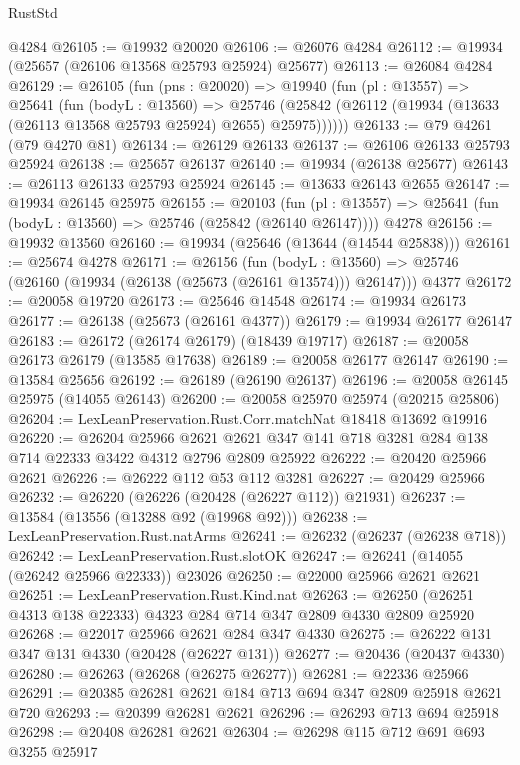 \begin{lexlean}{RustStd}
\begin{coremodule}
    @4284
@26105 := @19932 @20020
@26106 := @26076 @4284
@26112 := @19934 (@25657 (@26106 @13568 @25793 @25924) @25677)
@26113 := @26084 @4284
@26129 := @26105
    (fun (pns : @20020) =>
    @19940
      (fun (pl : @13557) =>
      @25641
        (fun (bodyL : @13560) =>
        @25746 (@25842 (@26112 (@19934 (@13633 (@26113 @13568 @25793 @25924) @2655) @25975))))))
@26133 := @79 @4261 (@79 @4270 @81)
@26134 := @26129 @26133
@26137 := @26106 @26133 @25793 @25924
@26138 := @25657 @26137
@26140 := @19934 (@26138 @25677)
@26143 := @26113 @26133 @25793 @25924
@26145 := @13633 @26143 @2655
@26147 := @19934 @26145 @25975
@26155 := @20103
    (fun (pl : @13557) => @25641 (fun (bodyL : @13560) => @25746 (@25842 (@26140 @26147))))
    @4278
@26156 := @19932 @13560
@26160 := @19934 (@25646 (@13644 (@14544 @25838)))
@26161 := @25674 @4278
@26171 := @26156
    (fun (bodyL : @13560) => @25746 (@26160 (@19934 (@26138 (@25673 (@26161 @13574))) @26147)))
    @4377
@26172 := @20058 @19720
@26173 := @25646 @14548
@26174 := @19934 @26173
@26177 := @26138 (@25673 (@26161 @4377))
@26179 := @19934 @26177 @26147
@26183 := @26172 (@26174 @26179) (@18439 @19717)
@26187 := @20058 @26173 @26179 (@13585 @17638)
@26189 := @20058 @26177 @26147
@26190 := @13584 @25656
@26192 := @26189 (@26190 @26137)
@26196 := @20058 @26145 @25975 (@14055 @26143)
@26200 := @20058 @25970 @25974 (@20215 @25806)
@26204 := LexLeanPreservation.Rust.Corr.matchNat @18418 @13692 @19916
@26220 := @26204
    @25966
    @2621
    @2621
    @347
    @141
    @718
    @3281
    @284
    @138
    @714
    @22333
    @3422
    @4312
    @2796
    @2809
    @25922
@26222 := @20420 @25966 @2621
@26226 := @26222 @112 @53 @112 @3281
@26227 := @20429 @25966
@26232 := @26220 (@26226 (@20428 (@26227 @112)) @21931)
@26237 := @13584 (@13556 (@13288 @92 (@19968 @92)))
@26238 := LexLeanPreservation.Rust.natArms
@26241 := @26232 (@26237 (@26238 @718))
@26242 := LexLeanPreservation.Rust.slotOK
@26247 := @26241 (@14055 (@26242 @25966 @22333)) @23026
@26250 := @22000 @25966 @2621 @2621
@26251 := LexLeanPreservation.Rust.Kind.nat
@26263 := @26250 (@26251 @4313 @138 @22333) @4323 @284 @714 @347 @2809 @4330 @2809 @25920
@26268 := @22017 @25966 @2621 @284 @347 @4330
@26275 := @26222 @131 @347 @131 @4330 (@20428 (@26227 @131))
@26277 := @20436 (@20437 @4330)
@26280 := @26263 (@26268 (@26275 @26277))
@26281 := @22336 @25966
@26291 := @20385 @26281 @2621 @184 @713 @694 @347 @2809 @25918 @2621 @720
@26293 := @20399 @26281 @2621
@26296 := @26293 @713 @694 @25918
@26298 := @20408 @26281 @2621
@26304 := @26298 @115 @712 @691 @693 @3255 @25917

\end{coremodule}
\end{lexlean}
